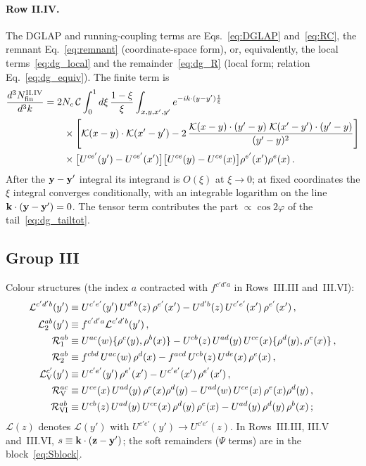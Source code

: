 \paragraph{Row II.IV.} The DGLAP and running-coupling terms are Eqs.~\eqref{eq:DGLAP} and~\eqref{eq:RC}, the remnant Eq.~\eqref{eq:remnant} (coordinate-space form), or, equivalently, the local terms~\eqref{eq:dg_local} and the remainder~\eqref{eq:dg_R} (local form; relation Eq.~\eqref{eq:dg_equiv}). The finite term is
\begin{align}\label{eq:app_IVfin}
\frac{d^3N^{\rm II.IV}_{\rm fin}}{d^3k}&=2N_c\,\mathcal C\int_0^1d\xi\,\frac{1-\xi}{\xi}\int_{x,y,x',y'}e^{-ik\cdot(y-y')\frac1\xi}\notag\\&\qquad\times\Bigg[\mathcal{K}(x-y)\cdot\mathcal{K}(x'-y')-2\,\frac{\mathcal{K}(x-y)\cdot(y'-y)\;\mathcal{K}(x'-y')\cdot(y'-y)}{(y'-y)^2}\Bigg]\notag\\
&\qquad\times\big[U^{ce'}(y')-U^{ce'}(x')\big]\big[U^{ce}(y)-U^{ce}(x)\big]\rho^{e'}(x')\rho^e(x)\,.
\end{align}
After the $\mathbf{y}-\mathbf{y}'$ integral its integrand is $O(\xi)$ at $\xi\to0$; at fixed coordinates the $\xi$ integral converges conditionally, with an integrable logarithm on the line $\mathbf{k}\cdot(\mathbf{y}-\mathbf{y}')=0$. The tensor term contributes the part $\propto\cos2\varphi$ of the tail~\eqref{eq:dg_tailtot}.

\subsection{Group III}

Colour structures (the index $a$ contracted with $f^{c'd'a}$ in Rows~III.III and~III.VI):
\begin{align}\label{eq:app_G3col}
\mathcal L^{c'd'b}(y')&\equiv U^{c'e'}(y')\,U^{d'b}(z)\,\rho^{e'}(x')-U^{d'b}(z)\,U^{c'e'}(x')\,\rho^{e'}(x')\,,\notag\\
\mathcal L^{ab}_2(y')&\equiv f^{c'd'a}\mathcal L^{c'd'b}(y')\,,\notag\\
\mathcal R_1^{ab}&\equiv U^{ac}(w)\{\rho^c(y),\rho^b(x)\}-U^{cb}(z)\,U^{ad}(y)\,U^{ce}(x)\{\rho^d(y),\rho^e(x)\}\,,\notag\\
\mathcal R_2^{ab}&\equiv f^{cbd}\,U^{ac}(w)\,\rho^d(x)-f^{acd}\,U^{cb}(z)\,U^{de}(x)\,\rho^e(x)\,,\notag\\
\mathcal L_{\rm V}^{c'}(y')&\equiv U^{c'e'}(y')\,\rho^{e'}(x')-U^{c'e'}(x')\,\rho^{e'}(x')\,,\notag\\
\mathcal R_{\rm V}^{ac}&\equiv U^{ce}(x)\,U^{ad}(y)\,\rho^e(x)\rho^d(y)-U^{ad}(w)\,U^{ce}(x)\,\rho^e(x)\rho^d(y)\,,\notag\\
\mathcal R_{\rm VI}^{ab}&\equiv U^{cb}(z)\,U^{ad}(y)\,U^{ce}(x)\,\rho^d(y)\,\rho^e(x)-U^{ad}(y)\,\rho^d(y)\,\rho^b(x)\,;
\end{align}
$\mathcal L(z)$ denotes $\mathcal L(y')$ with $U^{c'e'}(y')\to U^{c'e'}(z)$. In Rows~III.III, III.V and~III.VI, $s\equiv\mathbf{k}\cdot(\mathbf{z}-\mathbf{y}')$; the soft remainders ($\Psi$ terms) are in the block~\eqref{eq:Sblock}.

